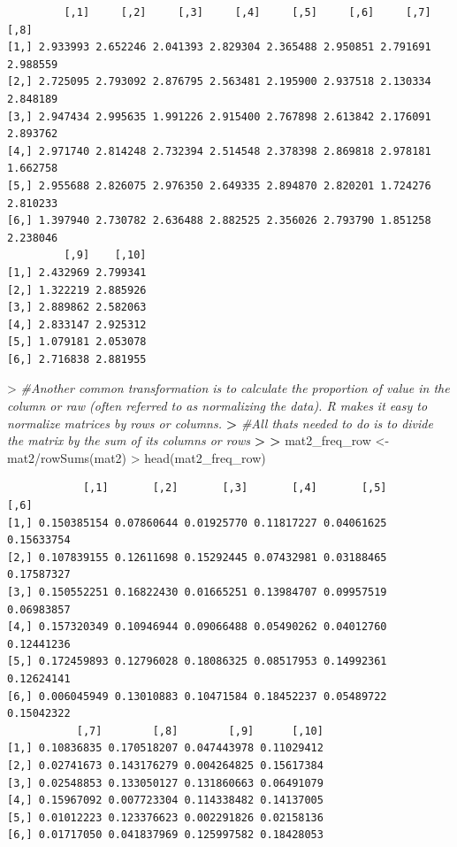 \documentclass[
]{book}
\newenvironment{Shaded}{\begin{snugshade}}{\end{snugshade}}
\newcommand{\CommentTok}[1]{\textcolor[rgb]{0.56,0.35,0.01}{\textit{#1}}}
\newcommand{\ErrorTok}[1]{\textcolor[rgb]{0.64,0.00,0.00}{\textbf{#1}}}
\newcommand{\FunctionTok}[1]{\textcolor[rgb]{0.00,0.00,0.00}{#1}}
\newcommand{\NormalTok}[1]{#1}
\newcommand{\OtherTok}[1]{\textcolor[rgb]{0.56,0.35,0.01}{#1}}
\newcommand{\SpecialCharTok}[1]{\textcolor[rgb]{0.00,0.00,0.00}{#1}}
\theoremstyle{definition}
\theoremstyle{definition}
\theoremstyle{definition}
\theoremstyle{definition}
\theoremstyle{remark}
\begin{document}
\begin{verbatim}
         [,1]     [,2]     [,3]     [,4]     [,5]     [,6]     [,7]     [,8]
[1,] 2.933993 2.652246 2.041393 2.829304 2.365488 2.950851 2.791691 2.988559
[2,] 2.725095 2.793092 2.876795 2.563481 2.195900 2.937518 2.130334 2.848189
[3,] 2.947434 2.995635 1.991226 2.915400 2.767898 2.613842 2.176091 2.893762
[4,] 2.971740 2.814248 2.732394 2.514548 2.378398 2.869818 2.978181 1.662758
[5,] 2.955688 2.826075 2.976350 2.649335 2.894870 2.820201 1.724276 2.810233
[6,] 1.397940 2.730782 2.636488 2.882525 2.356026 2.793790 1.851258 2.238046
         [,9]    [,10]
[1,] 2.432969 2.799341
[2,] 1.322219 2.885926
[3,] 2.889862 2.582063
[4,] 2.833147 2.925312
[5,] 1.079181 2.053078
[6,] 2.716838 2.881955
\end{verbatim}

\begin{Shaded}
\begin{Highlighting}[]
\SpecialCharTok{\textgreater{}} \CommentTok{\#Another common transformation is to calculate the proportion of value in the column or raw (often referred to as normalizing the data). R makes it easy to normalize matrices by rows or columns.}
\ErrorTok{\textgreater{}} \CommentTok{\#All that\textquotesingle{}s needed to do is to divide the matrix by the sum of its columns or rows}
\ErrorTok{\textgreater{}} 
\ErrorTok{\textgreater{}}\NormalTok{ mat2\_freq\_row }\OtherTok{\textless{}{-}}\NormalTok{ mat2}\SpecialCharTok{/}\FunctionTok{rowSums}\NormalTok{(mat2)}
\SpecialCharTok{\textgreater{}} \FunctionTok{head}\NormalTok{(mat2\_freq\_row)}
\end{Highlighting}
\end{Shaded}

\begin{verbatim}
            [,1]       [,2]       [,3]       [,4]       [,5]       [,6]
[1,] 0.150385154 0.07860644 0.01925770 0.11817227 0.04061625 0.15633754
[2,] 0.107839155 0.12611698 0.15292445 0.07432981 0.03188465 0.17587327
[3,] 0.150552251 0.16822430 0.01665251 0.13984707 0.09957519 0.06983857
[4,] 0.157320349 0.10946944 0.09066488 0.05490262 0.04012760 0.12441236
[5,] 0.172459893 0.12796028 0.18086325 0.08517953 0.14992361 0.12624141
[6,] 0.006045949 0.13010883 0.10471584 0.18452237 0.05489722 0.15042322
           [,7]        [,8]        [,9]      [,10]
[1,] 0.10836835 0.170518207 0.047443978 0.11029412
[2,] 0.02741673 0.143176279 0.004264825 0.15617384
[3,] 0.02548853 0.133050127 0.131860663 0.06491079
[4,] 0.15967092 0.007723304 0.114338482 0.14137005
[5,] 0.01012223 0.123376623 0.002291826 0.02158136
[6,] 0.01717050 0.041837969 0.125997582 0.18428053
\end{verbatim}
\end{document}
